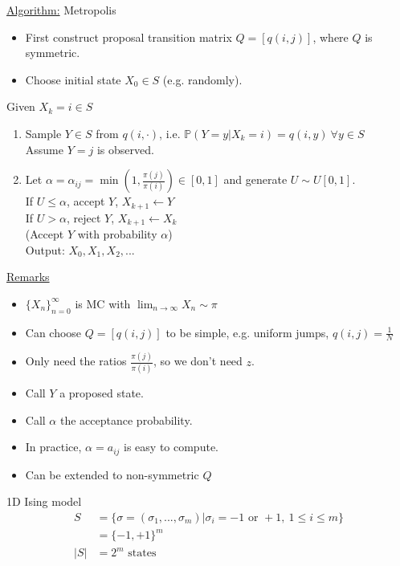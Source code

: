 \documentclass[12pt, letterpaper]{article}
\begin{document}
\noindent\underline{Algorithm:} Metropolis 
\begin{itemize}
    \item First construct proposal transition matrix $Q = [q(i,j)]$, where $Q$ is symmetric.
    \item Choose initial state $X_0 \in S$ (e.g. randomly).
\end{itemize}
Given $X_k = i \in S$
\begin{enumerate}
    \item Sample $Y\in S$ from $q(i,\cdot)$, i.e. $\mathbb{P}(Y=y | X_k =i) = q(i,y)\ \forall y \in S$ \\
    Assume $Y = j$ is observed.
    \item Let $\alpha = \alpha_{ij} = \min\left(1, \frac{\pi(j)}{\pi(i)}\right) \in [0,1]$ and generate $U \sim U[0,1]$. \\
    If $U\le \alpha$, accept $Y$, $X_{k+1} \leftarrow Y$ \\
    If $U > \alpha$, reject $Y$, $X_{k+1} \leftarrow X_k$ \\
    (Accept $Y$ with probability $\alpha$) \\
    Output: $X_0, X_1, X_2, ...$
\end{enumerate}

\noindent\underline{Remarks}
\begin{itemize}
    \item $\{X_n\}_{n=0}^\infty$ is MC with $\lim_{n\rightarrow\infty}X_n \sim \pi$
    \item Can choose $Q = [q(i,j)]$ to be simple, e.g. uniform jumps, $q(i,j) = \frac 1N$
    \item Only need the ratios $\frac{\pi(j)}{\pi(i)}$, so we don't need $z$.
    \item Call $Y$ a proposed state.
    \item Call $\alpha$ the acceptance probability.
    \item In practice, $\alpha = a_{ij}$ is easy to compute.
    \item Can be extended to non-symmetric $Q$
\end{itemize}
 1D Ising model
\begin{align*}
    S &= \{\sigma = (\sigma_1, ... , \sigma_m) | \sigma_i = -1 \text{ or } +1,\ 1\le i \le m\} \\
    &= \{-1,+1\}^m \\
    |S| &= 2^m \text{ states}
\end{align*}
\end{document}
